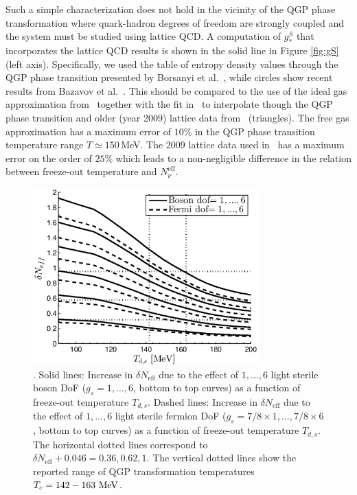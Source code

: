 Such a simple characterization does not hold in the vicinity of the QGP phase transformation where  quark-hadron degrees of freedom are strongly coupled  and the system must be studied using lattice QCD. A computation of $g_*^S$ that incorporates the lattice QCD results is shown in the solid line in Figure \ref{fig:gS} (left axis). Specifically, we used the table of entropy density values through the QGP phase transition presented by Borsanyi et al.~\cite{Borsanyi:2013bia}, while circles show recent results from Bazavov et al.~\cite{HotQCD:2014kol}. This should be compared to the use of the ideal gas approximation from~\cite{Coleman:2003hs} together with the fit in~\cite{Wantz:2009it} to interpolate though the QGP phase transition and older (year 2009) lattice data from~\cite{Bazavov:2009zn} (triangles). The free gas approximation has a maximum error of $10\%$ in the QGP phase transition  temperature range  $T\simeq 150$\,MeV.  The 2009 lattice data used in~\cite{Anchordoqui:2011nh} has a maximum error on the order of $25\%$ which leads to a non-negligible difference in the relation between freeze-out temperature and $N^{\text{eff}}_{\nu}$.

\begin{figure}
\centering
\begin{minipage}[b]{.49\textwidth}
\centerline{\hspace*{0.4cm}\includegraphics[height=6.8cm]{04-birrell/ModelIndStudy/Figures/Neff_Td_combined.eps}}
\end{minipage}
\caption{. Solid lines: Increase in $\delta N_{\text{eff}}$ due to the effect of $1,\dots,6$ light sterile boson DoF ($g_s=1,\dots,6$, bottom to top curves) as a function of freeze-out temperature $T_{d,s}$. Dashed lines: Increase in $\delta N_{\text{eff}}$ due to the effect of $1,\dots,6$ light sterile fermion DoF ($g_s=7/8\times 1,\dots,7/8\times 6$, bottom to top curves) as a function of freeze-out temperature $T_{d,s}$. The horizontal dotted lines correspond to $\delta N_{\text{eff}}+0.046=0.36,0.62,1$. The vertical dotted lines show the reported range of QGP transformation temperatures $T_c=142-163\text{ MeV}$.\label{fig:Neff_Td_zoom}}
\end{figure}


